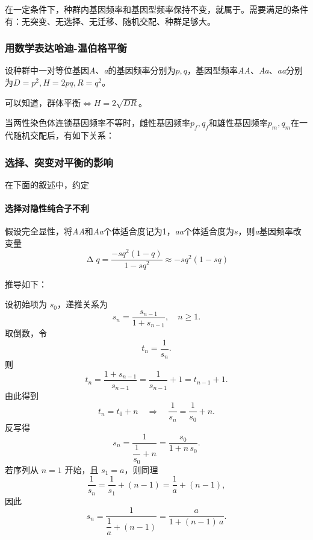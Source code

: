 在一定条件下，种群内基因频率和基因型频率保持不变，就属于。需要满足的条件有：无突变、无选择、无迁移、随机交配、种群足够大。


\subsubsection{用数学表达哈迪-温伯格平衡}

设种群中一对等位基因\textit{A}、\textit{a}的基因频率分别为$p, q$，基因型频率\textit{AA}、\textit{Aa}、\textit{aa}分别为$D=p^{2}, H=2pq, R=q^{2}$。

可以知道，群体平衡$\Leftrightarrow H=2\sqrt{DR}$。

当两性染色体连锁基因频率不等时，雌性基因频率$p_{f}, q_{f}$和雄性基因频率$p_{m}, q_{m}$在一代随机交配后，有如下关系：



\subsubsection{选择、突变对平衡的影响}

在下面的叙述中，约定

\paragraph{选择对隐性纯合子不利}

假设完全显性，将\textit{AA}和\textit{Aa}个体适合度记为1，\textit{aa}个体适合度为$s$，则\textit{a}基因频率改变量\[\upDelta q=\frac{-sq^{2}(1-q)}{1-sq^{2}}\approx-sq^{2}(1-sq)\]


推导如下：

设初始项为 \(s_0\)，递推关系为\[s_n = \frac{s_{n-1}}{1 + s_{n-1}}, \quad n \ge 1.\]取倒数，令\[t_n = \frac{1}{s_n}.\]
则
\[t_n 
= \frac{1 + s_{n-1}}{s_{n-1}}
= \frac{1}{s_{n-1}} + 1
= t_{n-1} + 1.
\]
由此得到
\[
t_n = t_0 + n
\quad\Longrightarrow\quad
\frac{1}{s_n} = \frac{1}{s_0} + n.
\]
反写得
\[
s_n 
= \frac{1}{\dfrac{1}{s_0} + n}
= \frac{s_0}{1 + n\,s_0}.
\]
若序列从 \(n=1\) 开始，且 \(s_1 = a\)，则同理
\[
\frac{1}{s_n} = \frac{1}{s_1} + (n-1) = \frac{1}{a} + (n-1),
\]
因此
\[
s_n 
= \frac{1}{\dfrac{1}{a} + (n-1)}
= \frac{a}{1 + (n-1)\,a}.
\]



